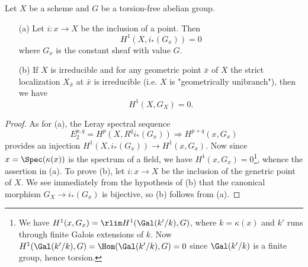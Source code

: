 \begin{proposition}\label{scheme etale cohomology of torsion-free at point}
Let $X$ be a scheme and $G$ be a torsion-free abelian group.
\begin{enumerate}
    \item[(a)] Let $i:x\to X$ be the inclusion of a point. Then
    \[H^1(X,i_*(G_x))=0\]
    where $G_x$ is the constant sheaf with value $G$.
    \item[(b)] If $X$ is irreducible and for any geometric point $\bar{x}$ of $X$ the strict localization $X_{\bar{x}}$ at $\bar{x}$ is irreducible (i.e. $X$ is "geometrically unibranch"), then we have
    \[H^1(X,G_X)=0.\] 
\end{enumerate}
\end{proposition}
\begin{proof}
As for (a), the Leray spectral sequence
\[E_2^{p,q}=H^p(X,R^qi_*(G_x))\Rightarrow H^{p+q}(x,G_x)\]
provides an injection $H^1(X,i_*(G_x))\to H^1(x,G_x)$. Now since $x=\Spec(\kappa(x))$ is the spectrum of a field, we have $H^1(x,G_x)=0$\footnote{We have $H^1(x,G_x)=\rlim H^1(\Gal(k'/k),G)$, where $k=\kappa(x)$ and $k'$ runs through finite Galois extensions of $k$. Now $H^1(\Gal(k'/k),G)=\Hom(\Gal(k'/k),G)=0$ since $\Gal(k'/k)$ is a finite group, hence torsion.}, whence the assertion in (a). To prove (b), let $i:x\to X$ be the inclusion of the genetric point of $X$. We see immediately from the hypothesis of (b) that the canonical morphism $G_X\to i_*(G_x)$ is bijective, so (b) follows from (a).
\end{proof}

